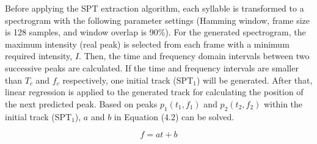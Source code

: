 \begin{table}[htb!]
\centering
\caption{Parameters used for spectral peak extraction}
\label{tab:SPT}
\end{table}

Before applying the SPT extraction algorithm, each syllable is transformed to a spectrogram with the following parameter settings (Hamming window, frame size is 128 samples, and window overlap is 90\%). For the generated spectrogram, the maximum intensity (real peak) is selected from each frame with a minimum required intensity, $I$. Then, the time and frequency domain intervals between two successive peaks are calculated. If the time and frequency intervals are smaller than $T_{c}$ and $f_{c}$ respectively, one initial track (SPT$_{1}$) will be generated. After that, linear regression is applied to the generated track for calculating the position of the next predicted peak. Based on peaks $p_{1}(t_{1},f_{1})$ and $p_{2}(t_{2},f_{2})$ within the initial track (SPT$_{1}$), $a$ and $b$ in Equation (4.2) can be solved. 

\begin{equation}
f= at+b
\end{equation}

